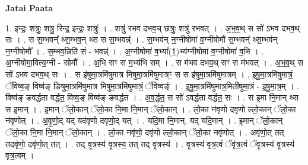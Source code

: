 \documentclass[17pt]{extarticle}
\begin{document}
\textbf{Jatai Paata} \newline

1. इन्द्रः॒ शत्रुः॒ शत्रु॒ रिन्द्र॒ इन्द्रः॒ शत्रुः॑ । . शत्रु॑ रभव दभव॒च् छत्रुः॒ शत्रु॑ रभवत् । . अ॒भ॒व॒थ् स सो॑ ऽभव दभव॒थ् सः । . स स॒म्भवन्᳚ थ्स॒म्भव॒न् थ्स स स॒म्भवन्न्॑ । . स॒म्भव॑न् न॒ग्नीषोमा॑ व॒ग्नीषोमौ॑ स॒म्भवन्᳚ थ्स॒म्भव॑न् न॒ग्नीषोमौ᳚ । . स॒म्भव॒न्निति॑ सं - भवन्न्॑ । . अ॒ग्नीषोमा॑ व॒भ्या᳚(1॒)भ्य॑ग्नीषोमा॑ व॒ग्नीषोमा॑ व॒भि । . अ॒ग्नीषोमा॒वित्य॒ग्नी - सोमौ᳚ । . अ॒भि सꣳ स म॒भ्य॑भि सम् । . स म॑भव दभव॒थ् सꣳ स म॑भवत् । . अ॒भ॒व॒थ् स सो॑ ऽभव दभव॒थ् सः । . स इ॑षुमा॒त्रमि॑षुमात्र मिषुमा॒त्रमि॑षुमात्रꣳ॒॒ स स इ॑षुमा॒त्रमि॑षुमात्रम् । . इ॒षु॒मा॒त्रमि॑षुमात्रं॒ ॅविष्व॒ङ् विष्व॑ङ् ङिषुमा॒त्रमि॑षुमात्र मिषुमा॒त्रमि॑षुमात्रं॒ ॅविष्वङ्॑ । . इ॒षु॒मा॒त्रमि॑षुमात्र॒मिती॑षुमा॒त्रं - इ॒षु॒मा॒त्र॒म् । . विष्व॑ङ् ङवर्द्धता वर्द्धत॒ विष्व॒ङ् विष्व॑ङ् ङवर्द्धत । . अ॒व॒र्द्ध॒त॒ स सो॑ ऽवर्द्धता वर्द्धत॒ सः । . स इ॒मा नि॒मान् थ्स स इ॒मान् । . इ॒मान् ॅलो॒कान् ॅलो॒का नि॒मा नि॒मान् ॅलो॒कान् । . लो॒का न॑वृणो दवृणो ल्लो॒कान् ॅलो॒का न॑वृणोत् । . अ॒वृ॒णो॒द् यद् यद॑वृणो दवृणो॒द् यत् । . यदि॒मा नि॒मान्. यद् यदि॒मान् । . इ॒मान् ॅलो॒कान् ॅलो॒का नि॒मा नि॒मान् ॅलो॒कान् । . लो॒का नवृ॑णो॒ दवृ॑णो ल्लो॒कान् ॅलो॒का नवृ॑णोत् । . अवृ॑णो॒त् तत् तदवृ॑णो॒ दवृ॑णो॒त् तत् । . तद् वृ॒त्रस्य॑ वृ॒त्रस्य॒ तत् तद् वृ॒त्रस्य॑ । . वृ॒त्रस्य॑ वृत्र॒त्वं ॅवृ॑त्र॒त्वं ॅवृ॒त्रस्य॑ वृ॒त्रस्य॑ वृत्र॒त्वम् । \newline
\end{document}
